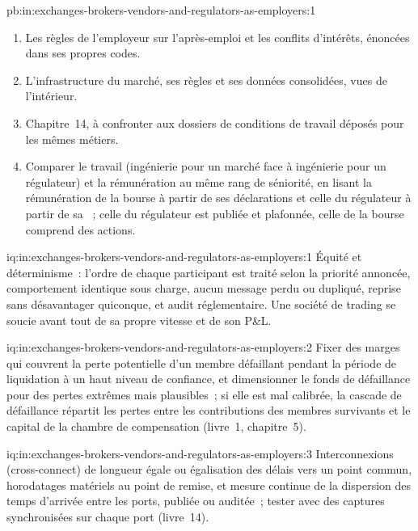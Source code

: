 \begin{solution}{pb:in:exchanges-brokers-vendors-and-regulators-as-employers:1}
\begin{enumerate}
\item Les règles de l'employeur sur l'après-emploi et les conflits d'intérêts, énoncées dans ses propres codes.
\item L'infrastructure du marché, ses règles et ses données consolidées, vues de l'intérieur.
\item Chapitre~14, à confronter aux dossiers de conditions de travail déposés pour les mêmes métiers.
\item Comparer le travail (ingénierie pour un marché face à ingénierie pour un régulateur) et la rémunération au même rang de séniorité, en lisant la
rémunération de la bourse à partir de ses déclarations et celle du régulateur à partir de sa ~; celle du régulateur est publiée et plafonnée, celle de la bourse
comprend des actions.
\end{enumerate}
\end{solution}

\begin{solution}{iq:in:exchanges-brokers-vendors-and-regulators-as-employers:1}
Équité et déterminisme~: l'ordre de chaque participant est traité selon la priorité annoncée, comportement identique sous charge, aucun
message perdu ou dupliqué, reprise sans désavantager quiconque, et audit réglementaire. Une société de trading se soucie avant tout de
sa propre vitesse et de son P\&L.
\end{solution}

\begin{solution}{iq:in:exchanges-brokers-vendors-and-regulators-as-employers:2}
Fixer des marges qui couvrent la perte potentielle d'un membre défaillant pendant la période de liquidation à un haut niveau de confiance, et dimensionner
le fonds de défaillance pour des pertes extrêmes mais plausibles~; si elle est mal calibrée, la cascade de défaillance répartit les pertes entre les contributions des membres survivants
et le capital de la chambre de compensation (livre~1, chapitre~5).
\end{solution}

\begin{solution}{iq:in:exchanges-brokers-vendors-and-regulators-as-employers:3}
Interconnexions (cross-connect) de longueur égale ou égalisation des délais vers un point commun, horodatages matériels au point de remise, et mesure continue
de la dispersion des temps d'arrivée entre les ports, publiée ou auditée~; tester avec des captures synchronisées sur chaque
port (livre~14).
\end{solution}

